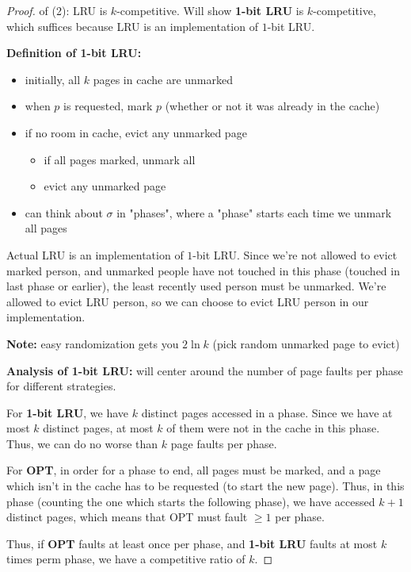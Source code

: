 \documentclass[11pt]{article}
\begin{document}
\begin{proof}
	of (2): LRU is $k$-competitive. Will show {\bf 1-bit LRU} is $k$-competitive, which suffices because LRU is an implementation of $1$-bit LRU.

	{\bf Definition of 1-bit LRU:}
	\begin{itemize}
		\item initially, all $k$ pages in cache are unmarked
		\item when $p$ is requested, mark $p$ (whether or not it was already in the cache)
		\item if no room in cache, evict any unmarked page
			\begin{itemize}
				\item if all pages marked, unmark all
				\item evict any unmarked page
			\end{itemize}
		\item can think about $\sigma$ in "phases", where a "phase" starts each time we unmark all pages
	\end{itemize}

	Actual LRU is an implementation of $1$-bit LRU. Since we're not allowed to evict marked person, and unmarked people have not touched in this phase (touched in last phase or earlier), the least recently used person must be unmarked. We're allowed to evict LRU person, so we can choose to evict LRU person in our implementation.

	{\bf Note:} easy randomization gets you $2\ln k$ (pick random unmarked page to evict)

	{\bf Analysis of 1-bit LRU:} will center around the number of page faults per phase for different strategies.

	For {\bf 1-bit LRU}, we have $k$ distinct pages accessed in a phase. Since we have at most $k$ distinct pages, at most $k$ of them were not in the cache in this phase. Thus, we can do no worse than $k$ page faults per phase.

	For {\bf OPT}, in order for a phase to end, all pages must be marked, and a page which isn't in the cache has to be requested (to start the new page). Thus, in this phase (counting the one which starts the following phase), we have accessed $k+1$ distinct pages, which means that OPT must fault $\geq 1$ per phase.

	Thus, if {\bf OPT} faults at least once per phase, and {\bf 1-bit LRU} faults at most $k$ times perm phase, we have a competitive ratio of $k$.
\end{proof}
\end{document}
